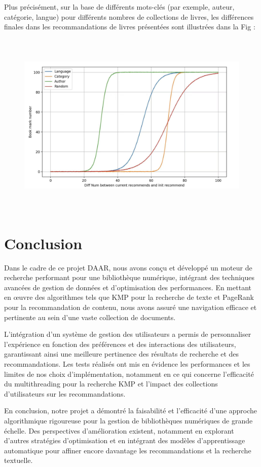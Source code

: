 \documentclass[11pt,english]{article}
\begin{document}
{    \indent Plus précisément, sur la base de différents mots-clés (par exemple, auteur, catégorie, langue) pour différents nombres de collections de livres, les différences finales dans les recommandations de livres présentées sont illustrées dans la Fig :

    \begin{figure}[H]
        \begin{center}
            \includegraphics[height=9cm]{./src/Rank4.jpg}
        \end{center}
    \end{figure}

    \section{Conclusion}

    \indent

    Dans le cadre de ce projet DAAR, nous avons conçu et développé un moteur de recherche performant pour une bibliothèque numérique, intégrant des techniques avancées de gestion de données et d'optimisation des performances. En mettant en œuvre des algorithmes tels que KMP pour la recherche de texte et PageRank pour la recommandation de contenu, nous avons assuré une navigation efficace et pertinente au sein d'une vaste collection de documents.

    \indent L'intégration d'un système de gestion des utilisateurs a permis de personnaliser l'expérience en fonction des préférences et des interactions des utilisateurs, garantissant ainsi une meilleure pertinence des résultats de recherche et des recommandations. Les tests réalisés ont mis en évidence les performances et les limites de nos choix d'implémentation, notamment en ce qui concerne l'efficacité du multithreading pour la recherche KMP et l'impact des collections d’utilisateurs sur les recommandations.

    \indent En conclusion, notre projet a démontré la faisabilité et l'efficacité d'une approche algorithmique rigoureuse pour la gestion de bibliothèques numériques de grande échelle. Des perspectives d'amélioration existent, notamment en explorant d'autres stratégies d'optimisation et en intégrant des modèles d'apprentissage automatique pour affiner encore davantage les recommandations et la recherche textuelle.
}
\end{document}
